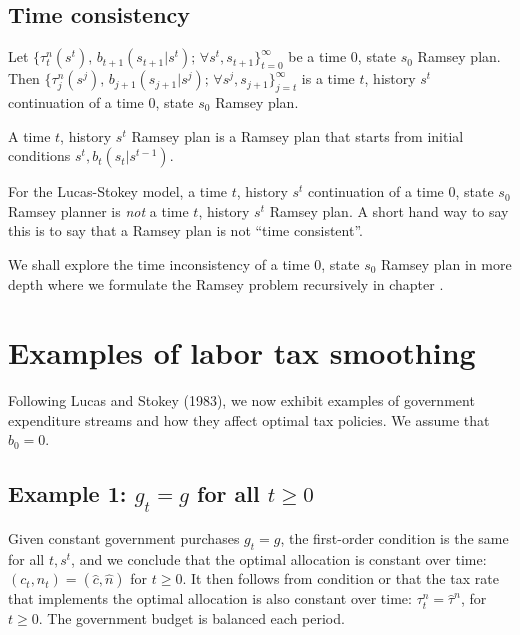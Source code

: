 \subsection{Time consistency}

  Let $\{\tau^n_t(s^t),\,
 b_{t+1}(s_{t+1}|s^t);\, \forall s^t, s_{t+1}\}_{t=0}^\infty$
be a  time $0$, state $s_0$ Ramsey plan.
Then $\{\tau^n_j(s^j),\,
 b_{j+1}(s_{j+1}|s^j);\, \forall s^j, s_{j+1}\}_{j=t}^\infty$
is a  time $t$, history $s^t$
  continuation of a time $0$, state $s_0$  Ramsey plan.


\medskip
{} A time $t$, history $s^t$  Ramsey plan is a Ramsey plan  that starts from initial conditions $s^t, b_t(s_t|s^{t-1})$.


\medskip

  For the Lucas-Stokey model, a time $t$, history $s^t$ continuation  of a time $0$, state $s_0$ Ramsey planner is
{\it not\/} a time $t$, history $s^t$ Ramsey plan.
A short hand way to say this is to say that
a Ramsey plan is not ``time consistent''.
%

\medskip

\noindent We shall explore the time inconsistency  of a  time  $0$, state $s_0$ Ramsey plan in more depth  %
 where we formulate
the Ramsey problem recursively in chapter .



\section{Examples of labor tax smoothing}\label{sec:labor_tax_smoothing}%
Following Lucas and Stokey (1983),
we now exhibit examples of government expenditure streams and how
they affect optimal tax policies. %
We assume that $b_0=0$.


\subsection{Example 1: $g_t=g$ for all $t\geq0$}
\label{sec:LucasStokey_ex1}%
Given  constant  government purchases $g_t=g$, the first-order condition
 is the same for all $t, s^t$, and we conclude that the
optimal allocation is constant over time: $(c_t,n_t)=(\hat c, \hat n)$
for $t\geq 0$. It then follows from condition  or
 that the tax rate
that  implements the optimal allocation is also constant over
time: $\tau^n_t=\hat \tau^n$, for $t\geq 0$.
The government budget is balanced  each period.

